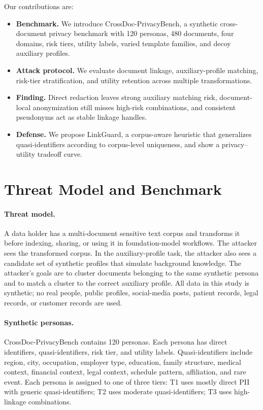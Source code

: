 \documentclass[10pt,twocolumn]{article}
\newcommand{\method}{LinkGuard}
\newcommand{\bench}{CrossDoc-PrivacyBench}
\begin{document}
Our contributions are:
\begin{itemize}
    \item \textbf{Benchmark.} We introduce \bench, a synthetic cross-document privacy benchmark with 120 personas, 480 documents, four domains, risk tiers, utility labels, varied template families, and decoy auxiliary profiles.
    \item \textbf{Attack protocol.} We evaluate document linkage, auxiliary-profile matching, risk-tier stratification, and utility retention across multiple transformations.
    \item \textbf{Finding.} Direct redaction leaves strong auxiliary matching risk, document-local anonymization still misses high-risk combinations, and consistent pseudonyms act as stable linkage handles.
    \item \textbf{Defense.} We propose \method, a corpus-aware heuristic that generalizes quasi-identifiers according to corpus-level uniqueness, and show a privacy--utility tradeoff curve.
\end{itemize}

\section{Threat Model and Benchmark}
\paragraph{Threat model.}
A data holder has a multi-document sensitive text corpus and transforms it before indexing, sharing, or using it in foundation-model workflows.
The attacker sees the transformed corpus.
In the auxiliary-profile task, the attacker also sees a candidate set of synthetic profiles that simulate background knowledge.
The attacker's goals are to cluster documents belonging to the same synthetic persona and to match a cluster to the correct auxiliary profile.
All data in this study is synthetic; no real people, public profiles, social-media posts, patient records, legal records, or customer records are used.

\paragraph{Synthetic personas.}
\bench{} contains 120 personas.
Each persona has direct identifiers, quasi-identifiers, risk tier, and utility labels.
Quasi-identifiers include region, city, occupation, employer type, education, family structure, medical context, financial context, legal context, schedule pattern, affiliation, and rare event.
Each persona is assigned to one of three tiers:
T1 uses mostly direct PII with generic quasi-identifiers; T2 uses moderate quasi-identifiers; T3 uses high-linkage combinations.
\end{document}
